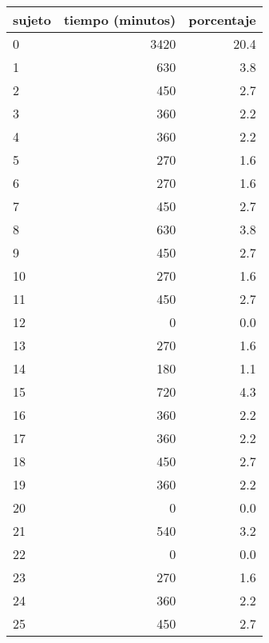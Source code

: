 \documentclass[spanish]{article}
\begin{document}
\begin{table}[h!]
\begin{center}
\begin{tabular}{|l|r|r|}
\hline
sujeto & tiempo (minutos) & porcentaje   \\ \hline
     0 &             3420 &          20.4\\ \hline
     1 &              630 &           3.8\\ \hline
     2 &              450 &           2.7\\ \hline
     3 &              360 &           2.2\\ \hline
     4 &              360 &           2.2\\ \hline
     5 &              270 &           1.6\\ \hline
     6 &              270 &           1.6\\ \hline
     7 &              450 &           2.7\\ \hline
     8 &              630 &           3.8\\ \hline
     9 &              450 &           2.7\\ \hline
    10 &              270 &           1.6\\ \hline
    11 &              450 &           2.7\\ \hline
    12 &                0 &           0.0\\ \hline
    13 &              270 &           1.6\\ \hline
    14 &              180 &           1.1\\ \hline
    15 &              720 &           4.3\\ \hline
    16 &              360 &           2.2\\ \hline
    17 &              360 &           2.2\\ \hline
    18 &              450 &           2.7\\ \hline
    19 &              360 &           2.2\\ \hline
    20 &                0 &           0.0\\ \hline
    21 &              540 &           3.2\\ \hline
    22 &                0 &           0.0\\ \hline
    23 &              270 &           1.6\\ \hline
    24 &              360 &           2.2\\ \hline
    25 &              450 &           2.7\\ \hline

\end{tabular}
\end{center}
\end{table}
\end{document}
